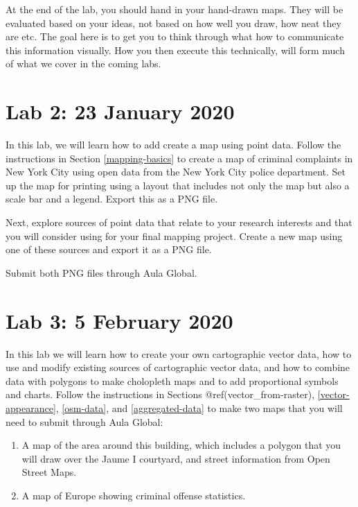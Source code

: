 \documentclass[]{book}
\providecommand{\tightlist}{%
  \setlength{\itemsep}{0pt}\setlength{\parskip}{0pt}}
\begin{document}
At the end of the lab, you should hand in your hand-drawn maps. They will be evaluated based on your ideas, not based on how well you draw, how neat they are etc. The goal here is to get you to think through what how to communicate this information visually. How you then execute this technically, will form much of what we cover in the coming labs.

\hypertarget{lab-2-23-january-2020}{%
\section*{Lab 2: 23 January 2020}\label{lab-2-23-january-2020}}

In this lab, we will learn how to add create a map using point data. Follow the instructions in Section \ref{mapping-basics} to create a map of criminal complaints in New York City using open data from the New York City police department. Set up the map for printing using a layout that includes not only the map but also a scale bar and a legend. Export this as a PNG file.

Next, explore sources of point data that relate to your research interests and that you will consider using for your final mapping project. Create a new map using one of these sources and export it as a PNG file.

Submit both PNG files through Aula Global.

\hypertarget{lab-3-5-february-2020}{%
\section*{Lab 3: 5 February 2020}\label{lab-3-5-february-2020}}

In this lab we will learn how to create your own cartographic vector data, how to use and modify existing sources of cartographic vector data, and how to combine data with polygons to make cholopleth maps and to add proportional symbols and charts. Follow the instructions in Sections @ref(vector\_from-raster), \ref{vector-appearance}, \ref{osm-data}, and \ref{aggregated-data} to make two maps that you will need to submit through Aula Global:

\begin{enumerate}
\def\labelenumi{\arabic{enumi}.}
\tightlist
\item
  A map of the area around this building, which includes a polygon that you will draw over the Jaume I courtyard, and street information from Open Street Maps.
\item
  A map of Europe showing criminal offense statistics.
\end{enumerate}
\end{document}
